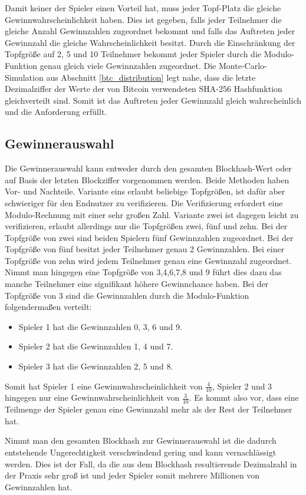 Damit keiner der Spieler einen Vorteil hat, muss jeder Topf-Platz die gleiche Gewinnwahrscheinlichkeit haben.
Dies ist gegeben, falls jeder Teilnehmer die gleiche Anzahl Gewinnzahlen zugeordnet bekommt und falls das Auftreten jeder Gewinnzahl die gleiche Wahrscheinlichkeit besitzt. Durch die Einschränkung der Topfgröße auf 2, 5 und 10 Teilnehmer bekommt jeder Spieler durch die Modulo-Funktion genau gleich viele Gewinnzahlen zugeordnet. Die Monte-Carlo-Simulation aus Abschnitt \ref{btc_distribution} legt nahe, dass die letzte Dezimalziffer der Werte der von Bitcoin verwendeten SHA-256 Hashfunktion gleichverteilt sind. Somit ist das Auftreten jeder Gewinnzahl gleich wahrscheinlich und die Anforderung erfüllt.

\subsection{Gewinnerauswahl}\label{btc_gewinnerauswahl}
Die Gewinnerauswahl kann entweder durch den gesamten Blockhash-Wert oder auf Basis der letzten Blockziffer vorgenommen werden.
Beide Methoden haben Vor- und Nachteile. Variante eins erlaubt beliebige Topfgrößen, ist dafür aber schwieriger für den Endnutzer zu verifizieren. Die Verifizierung erfordert eine Modulo-Rechnung mit einer sehr großen Zahl. Variante zwei ist dagegen leicht zu verifizieren, erlaubt allerdings nur die Topfgrößen zwei, fünf und zehn. Bei der Topfgröße von zwei sind beiden Spielern fünf Gewinnzahlen zugeordnet. Bei der Topfgröße von fünf besitzt jeder Teilnehmer genau 2 Gewinnzahlen. Bei einer Topfgröße von zehn wird jedem Teilnehmer genau eine Gewinnzahl zugeordnet. 
Nimmt man hingegen eine Topfgröße von 3,4,6,7,8 und 9 führt dies dazu das manche Teilnehmer eine signifikant höhere Gewinnchance haben.
Bei der Topfgröße von 3 sind die Gewinnzahlen durch die Modulo-Funktion folgendermaßen verteilt:
\begin{itemize}
\item Spieler 1 hat die Gewinnzahlen 0, 3, 6 und 9.
\item Spieler 2 hat die Gewinnzahlen 1, 4 und 7.
\item Spieler 3 hat die Gewinnzahlen 2, 5 und 8.
\end{itemize}
Somit hat Spieler 1 eine Gewinnwahrscheinlichkeit von $\frac{4}{10}$, Spieler 2 und 3 hingegen nur eine Gewinnwahrscheinlichkeit von $\frac{3}{10}$. Es kommt also vor, dass eine Teilmenge der Spieler genau eine Gewinnzahl mehr als der Rest der Teilnehmer hat.

Nimmt man den gesamten Blockhash zur Gewinnerauswahl ist die dadurch entstehende Ungerechtigkeit verschwindend gering und kann vernachlässigt werden. Dies ist der Fall, da die aus dem Blockhash resultierende Dezimalzahl in der Praxis sehr groß ist und jeder Spieler somit mehrere Millionen von Gewinnzahlen hat.

